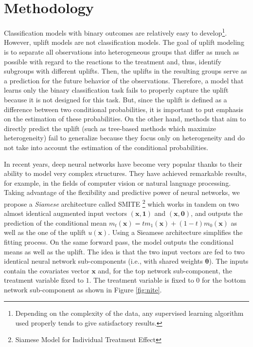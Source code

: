 \documentclass{article}
\def\x{\mathbf x}
\begin{document}
\section{Methodology}
\label{sec:methodology}


Classification models with binary outcomes are relatively easy to develop\footnote{Depending on the complexity of the data, any supervised learning algorithm used properly tends to give satisfactory results.}. However, uplift models are not classification models. The goal of uplift modeling is to separate all observations into heterogeneous groups that differ as much as possible with regard to the reactions to the treatment and, thus, identify subgroups with different uplifts. Then, the uplifts in the resulting groups serve as a prediction for the future behavior of the observations. Therefore, a model that learns only the binary classification task fails to properly capture the uplift because it is not designed for this task. But, since the uplift is defined as a difference between two conditional probabilities, it is important to put emphasis on the estimation of these probabilities. On the other hand, methods that aim to directly predict the uplift (such as tree-based methods which maximize heterogeneity) fail to generalize because they focus only on heterogeneity and do not take into account the estimation of the conditional probabilities.

In recent years, deep neural networks have become very popular thanks to their ability to model very complex structures. They have achieved remarkable results, for example, in the fields of computer vision or natural language processing. Taking advantage of the flexibility and predictive power of neural networks, we propose a \textit{Siamese} \citep{bromley1994signature} architecture called SMITE \footnote{Siamese Model for Individual Treatment Effect} which works in tandem on two almost identical augmented input vectors $(\x,\mathbf{1})$ and $(\x,\mathbf{0})$, and outputs the prediction of the conditional mean $m_t(\x) = tm_1(\x) + (1-t)m_0(\x)$ as well as the one of the uplift $u(\x)$. Using a Sieamese architecture simplifies the fitting process. On the same forward pass, the model outputs the conditional means as well as the uplift. The idea is that the two input vectors are fed to two identical neural network sub-components (i.e., with shared weights $\boldsymbol{\theta}$). The inputs contain the covariates vector $\x$ and, for the top network sub-component, the treatment variable fixed to $1$. The treatment variable is fixed to $0$ for the bottom network sub-component as shown in Figure \ref{fig:nite}. 
\end{document}
